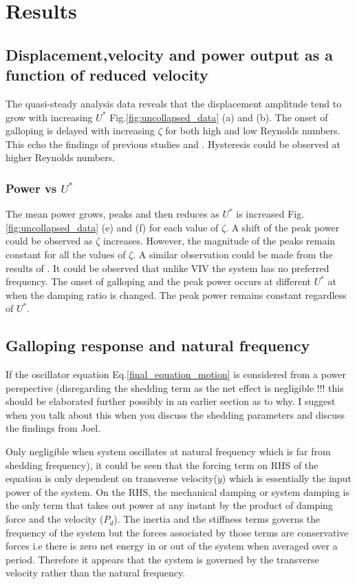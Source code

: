 
\section{Results}


\subsection{Displacement,velocity and power output as a function of reduced velocity}


 The quasi-steady analysis data reveals that the displacement amplitude tend to grow with increasing $U^*$ Fig.\ref{fig:uncollapsed_data} (a) and (b). The onset of galloping is delayed with increasing $\zeta$ for both high and low Reynolds numbers. This echo the findings of previous studies \cite{Parkinson1964} and \cite{Barrero-Gil2010a}. Hysteresis could be observed at higher Reynolds numbers. 

 
 \subsubsection*{Power vs $U^*$}
 
 The mean power grows, peaks and then reduces as $U^*$ is increased Fig.\ref{fig:uncollapsed_data} (e) and (f) for each value of $\zeta$. A shift of the peak power could be observed as $\zeta$ increases. However, the magnitude of the peaks remain constant for all the values of $\zeta$. A similar observation could be made from the results of \cite{Barrero-Gil2010a}. It could be observed that unlike VIV the  system has no preferred frequency. The onset of galloping and the peak power occurs at different $U^*$ at when the damping ratio is changed. The peak power remains constant regardless of $U^*$.
 
 \subsection{Galloping response and natural frequency}
 
 If the oscillator equation Eq.\eqref{final_equation_motion} is considered from a power perspective (disregarding the shedding term as the net effect is negligible !!! this should be elaborated further possibly in an earlier section as to why. I suggest when you talk about this when you discuss the shedding parameters and discuss the findings from Joel. 
 
 Only negligible when system oscillates at natural frequency which is far from shedding frequency), it could be seen that the forcing term on RHS of the equation is only dependent on transverse velocity($\dot{y}$) which is essentially the input power of the system. On the RHS, the mechanical damping or system damping is the only term that takes out power at any instant by the product of damping force and the velocity ($P_d$). The inertia and the stiffness terms governs the frequency of the system but the forces associated by those terms are conservative forces i.e there is zero net energy in or out of the system when averaged over a period. Therefore it appears that the system is governed by the transverse velocity rather than the natural frequency.
 

